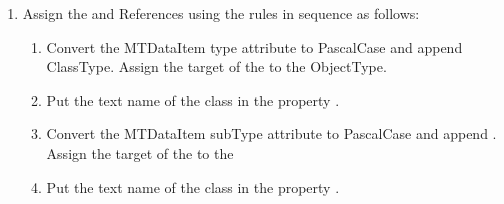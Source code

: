 \begin{enumerate}
\begin{itemize}
\begin{enumerate}
\begin{enumerate}
        \item If the  matches one of the ; the MTConnect UA \gls{TypeDefinition} is .
        
        \item If the  matches one of the ; the MTConnect UA \gls{TypeDefinition}  is .
        
        \item If the  matches one of the  , the MTConnect UA \gls{TypeDefinition} is . The  will be assigned as follows:
        \newline
        
        Each of the \glspl{ObjectType} matching the  for  will have a \gls{Property} . The  will reference the  with the values of the \gls{ControlledVocab}.
        
        \item Otherwise, the UA \gls{TypeDefinition} is . This will apply to all extended types.
      \end{enumerate}
    \end{enumerate}
  \end{itemize}
  
  \item Assign the  and  \glspl{Reference} using the rules in sequence as follows:
  \begin{enumerate}
    \item Convert the \gls{MTDataItem} \gls{type} attribute to \gls{PascalCase} and append \gls{ClassType}. Assign the target of the  to the \gls{ObjectType}.
    \item Put the text name of the class in the property .
    \item Convert the \gls{MTDataItem} \gls{subType} attribute to \gls{PascalCase} and append . Assign the target of the  to the 
    \item Put the text name of the class in the property .
  \end{enumerate}
  

\end{enumerate}
